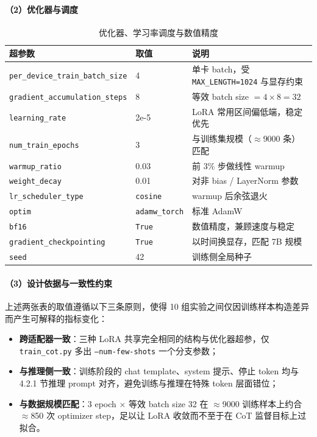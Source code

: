 \paragraph{（2）优化器与调度}
\begin{table}[!htb]
  \centering
  \caption{优化器、学习率调度与数值精度}
  \label{tab:ch4-lora-optim}
  \footnotesize
  \begin{tabular}{lll}
    \toprule
    超参数 & 取值 & 说明 \\
    \midrule
    \texttt{per\_device\_train\_batch\_size} & 4  & 单卡 batch，受 \texttt{MAX\_LENGTH=1024} 与显存约束 \\
    \texttt{gradient\_accumulation\_steps}  & 8  & 等效 batch size $= 4 \times 8 = 32$ \\
    \texttt{learning\_rate}                 & 2e-5 & LoRA 常用区间偏低端，稳定优先 \\
    \texttt{num\_train\_epochs}             & 3  & 与训练集规模（$\approx$9000 条）匹配 \\
    \texttt{warmup\_ratio}                  & 0.03 & 前 3\% 步做线性 warmup \\
    \texttt{weight\_decay}                  & 0.01 & 对非 bias / LayerNorm 参数 \\
    \texttt{lr\_scheduler\_type}            & \texttt{cosine} & warmup 后余弦退火 \\
    \texttt{optim}                          & \texttt{adamw\_torch} & 标准 AdamW \\
    \texttt{bf16}                           & \texttt{True} & 数值精度，兼顾速度与稳定 \\
    \texttt{gradient\_checkpointing}        & \texttt{True} & 以时间换显存，匹配 7B 规模 \\
    \texttt{seed}                           & 42 & 训练侧全局种子 \\
    \bottomrule
  \end{tabular}
\end{table}

\paragraph{（3）设计依据与一致性约束}
上述两张表的取值遵循以下三条原则，使得 10 组实验之间仅因训练样本构造差异而产生可解释的指标变化：
\begin{itemize}
    \item \textbf{跨适配器一致}：三种 LoRA 共享完全相同的结构与优化器超参，仅 \texttt{train\_cot.py} 多出 \texttt{--num-few-shots} 一个分支参数；
    \item \textbf{与推理侧一致}：训练阶段的 chat template、system 提示、停止 token 均与 4.2.1 节推理 prompt 对齐，避免训练与推理在特殊 token 层面错位；
    \item \textbf{与数据规模匹配}：$3$ epoch $\times$ 等效 batch size 32 在 $\approx$9000 训练样本上约合 $\approx$850 次 optimizer step，足以让 LoRA 收敛而不至于在 CoT 监督目标上过拟合。
\end{itemize}
